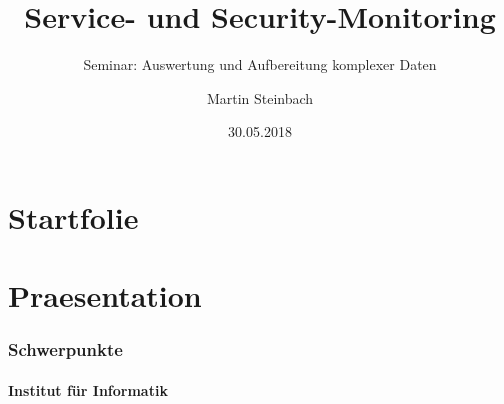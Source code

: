 \documentclass{beamer}
\title{Service- und Security-Monitoring}
\subtitle{Seminar: Auswertung und Aufbereitung komplexer Daten}
\institute{Institut für Informatik Universität Rostock}
\author{Martin Steinbach}
\date{30.05.2018}
\begin{document}
\part{Startfolie}
\begin{frame}
\titlepage
\end{frame}

\part{Praesentation}
\section{Schwerpunkte}
\subsection{Institut für Informatik}
\begin{frame}
  
\end{frame}
\end{document}
